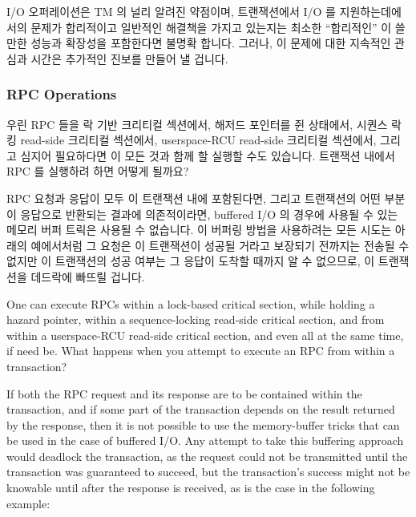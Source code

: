 I/O 오퍼레이션은 TM 의 널리 알려진 약점이며, 트랜잭션에서 I/O 를
지원하는데에서의 문제가 합리적이고 일반적인 해결책을 가지고 있는지는 최소한
``합리적인'' 이 쓸만한 성능과 확장성을 포함한다면 불명확 합니다.
그러나, 이 문제에 대한 지속적인 관심과 시간은 추가적인 진보를 만들어 낼 겁니다.

\subsubsection{RPC Operations}
\label{sec:future:RPC Operations}

우린 RPC 들을 락 기반 크리티컬 섹션에서, 해저드 포인터를 쥔 상태에서, 시퀀스
락킹 read-side 크리티컬 섹션에서, userspace-RCU read-side 크리티컬 섹션에서,
그리고 심지어 필요하다면 이 모든 것과 함께 할 실행할 수도 있습니다.
트랜잭션 내에서 RPC 를 실행하려 하면 어떻게 될까요?

RPC 요청과 응답이 모두 이 트랜잭션 내에 포함된다면, 그리고 트랜잭션의 어떤
부분이 응답으로 반환되는 결과에 의존적이라면, buffered I/O 의 경우에 사용될 수
있는 메모리 버퍼 트릭은 사용될 수 없습니다.
이 버퍼링 방법을 사용하려는 모든 시도는 아래의 예에서처럼 그 요청은 이
트랜잭션이 성공될 거라고 보장되기 전까지는 전송될 수 없지만 이 트랜잭션의 성공
여부는 그 응답이 도착할 때까지 알 수 없으므로, 이 트랜잭션을 데드락에 빠뜨릴
겁니다.

\iffalse

One can execute RPCs within a lock-based critical section, while holding
a hazard pointer, within a sequence-locking read-side critical section,
and from within a userspace-RCU read-side critical section, and even
all at the same time, if need be.
What happens when you attempt to execute an RPC from within a transaction?

If both the RPC request and its response are to be contained within the
transaction, and if some part of the transaction depends on the result
returned by the response, then it is not possible to use the memory-buffer
tricks that can be used in the case of buffered I/O\@.
Any attempt to
take this buffering approach would deadlock the transaction, as the
request could not be transmitted until the transaction was guaranteed
to succeed, but the transaction's success might not be knowable until
after the response is received, as is the case in the following example:

